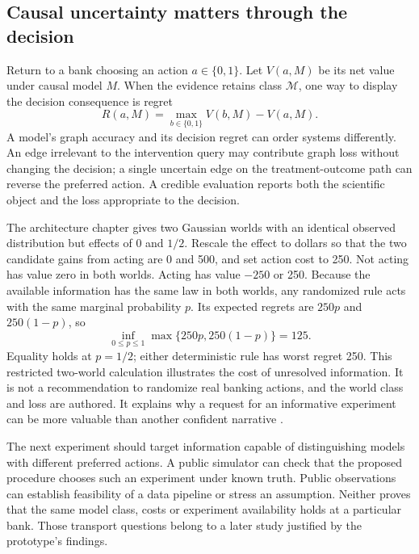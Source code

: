 \subsection{Causal uncertainty matters through the decision}

Return to a bank choosing an action $a\in\{0,1\}$. Let $V(a,M)$ be its net
value under causal model $M$. When the evidence retains class $\mathcal M$,
one way to display the decision consequence is regret
\begin{equation}
 R(a,M)=\max_{b\in\{0,1\}}V(b,M)-V(a,M).
 \label{exec13:frontier-regret}
\end{equation}
A model's graph accuracy and its decision regret can order systems differently.
An edge irrelevant to the intervention query may contribute graph loss without
changing the decision; a single uncertain edge on the treatment-outcome path
can reverse the preferred action. A credible evaluation reports both the
scientific object and the loss appropriate to the decision.

The architecture chapter gives two Gaussian worlds with an identical observed
distribution but effects of 0 and $1/2$. Rescale the effect to dollars so that
the two candidate gains from acting are 0 and 500, and set action cost to 250.
Not acting has value zero in both worlds. Acting has value $-250$ or 250.
Because the available information has the same law in both worlds, any
randomized rule acts with the same marginal probability $p$. Its expected
regrets are $250p$ and $250(1-p)$, so
\begin{equation}
 \inf_{0\leq p\leq1}\max\{250p,250(1-p)\}=125.
 \label{exec13:frontier-minimax}
\end{equation}
Equality holds at $p=1/2$; either deterministic rule has worst regret 250.
This restricted two-world calculation illustrates the cost of unresolved
information. It is not a recommendation to randomize real banking actions,
and the world class and loss are authored. It explains why a request for an
informative experiment can be more valuable than another confident narrative
\citep{exec13_architecture_exact,exec13_frontier_exact}.

The next experiment should target information capable of distinguishing models
with different preferred actions. A public simulator can check that the
proposed procedure chooses such an experiment under known truth. Public
observations can establish feasibility of a data pipeline or stress an
assumption. Neither proves that the same model class, costs or experiment
availability holds at a particular bank. Those transport questions belong to
a later study justified by the prototype's findings.

